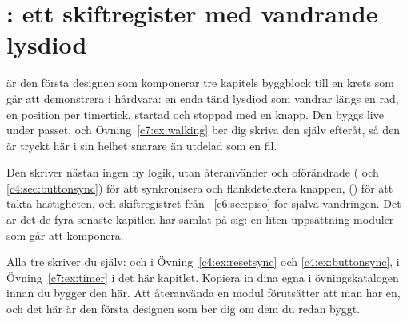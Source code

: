 \section{: ett skiftregister med vandrande lysdiod}
\label{c7:sec:walking}

 är den första designen som komponerar tre kapitels byggblock till en krets som
går att demonstrera i hårdvara: en enda tänd lysdiod som vandrar längs en rad, en position per
timertick, startad och stoppad med en knapp. Den byggs live under passet, och
Övning~\ref{c7:ex:walking} ber dig skriva den själv efteråt, så den är tryckt här i sin helhet
snarare än utdelad som en fil.

Den skriver nästan ingen ny logik, utan återanvänder  och 
oförändrade ( och \ref{c4:sec:buttonsync}) för att synkronisera och
flankdetektera knappen,  () för att takta hastigheten, och
skiftregistret från --\ref{c6:sec:piso} för själva vandringen. Det är det de
fyra senaste kapitlen har samlat på sig: en liten uppsättning moduler som går att komponera.

Alla tre skriver du själv:  och  i Övning~\ref{c4:ex:resetsync}
och \ref{c4:ex:buttonsync},  i Övning~\ref{c7:ex:timer} i det här kapitlet. Kopiera in
dina egna i övningskatalogen innan du bygger den här. Att återanvända en modul förutsätter att man
har en, och det här är den första designen som ber dig om dem du redan byggt.

